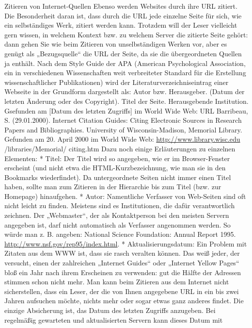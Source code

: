 \documentclass[]{book}
\theoremstyle{definition}
\theoremstyle{definition}
\theoremstyle{definition}
\theoremstyle{remark}
\begin{document}
Zitieren von Internet-Quellen Ebenso werden Websites durch ihre URL
zitiert. Die Besonderheit daran ist, dass durch die URL jede einzelne
Seite für sich, wie ein selbständiges Werk, zitiert werden kann.
Trotzdem will der Leser vielleicht gern wissen, in welchem Kontext bzw.
zu welchem Server die zitierte Seite gehört: dann gehen Sie wie beim
Zitieren von unselbständigen Werken vor, aber es genügt als
„Bezugsquelle`` die URL der Seite, da sie die übergeordneten Quellen ja
enthält. Nach dem Style Guide der APA (American Psychological
Association, ein in verschiedenen Wissenschaften weit verbreiteter
Standard für die Erstellung wissenschaftlicher Publikationen) wird der
Literaturverzeichniseintrag einer Webseite in der Grundform dargestellt
als: Autor bzw. Herausgeber. (Datum der letzten Änderung oder des
Copyright). Titel der Seite. Herausgebende Institution. Gsefunden am
{[}Datum des letzten Zugriffs{]} im World Wide Web: URL Barribeau, S.
(29.01.2000). Internet Citation Guides: Citing Electronic Sources in
Research Papers and Bibliographies. University of Wisconsin-Madison,
Memorial Library. Gefunden am 20. April 2000 im World Wide Web:
\url{http://www.library.wisc.edu} /libraries/Memorial/ citing.htm Dazu
noch einige Erläuterungen zu einzelnen Elementen: * Titel: Der Titel
wird so angegeben, wie er im Browser-Fenster erscheint (und nicht etwa
die HTML-Kurzbezeichnung, wie man sie in den Bookmarks wiederfindet). Da
untergeordnete Seiten nicht immer einen Titel haben, sollte man zum
Zitieren in der Hierarchie bis zum Titel (bzw. zur Homepage)
hinaufgehen. * Autor: Namentliche Verfasser von Web-Seiten sind oft
nicht leicht zu finden. Meistens sind es Institutionen, die dafür
verantwortlich zeichnen. Der „Webmaster``, der als Kontaktperson bei den
meisten Servern angegeben ist, darf nicht automatisch als Verfasser
angenommen werden. So würde man z. B. angeben: National Science
Foundation: Annual Report 1995.
\url{http://www.nsf.gov/rep95/index.html}. * Aktualisierungsdatum: Ein
Problem mit Zitaten aus dem WWW ist, dass sie rasch veralten können. Das
weiß jeder, der versucht, einen der zahlreichen „Internet Guides`` oder
„Internet Yellow Pages`` bloß ein Jahr nach ihrem Erscheinen zu
verwenden: gut die Hälfte der Adressen stimmen schon nicht mehr. Man
kann beim Zitieren aus dem Internet nicht sicherstellen, dass ein Leser,
der die von Ihnen angegebene URL in ein bis zwei Jahren aufsuchen
möchte, nichts mehr oder sogar etwas ganz anderes findet. Die einzige
Absicherung ist, das Datum des letzten Zugriffs anzugeben. Bei
regelmäßig gewarteten und aktualisierten Servern kann dieses Datum mit
\end{document}
